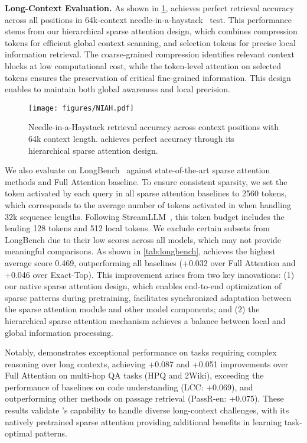 \textbf{Long-Context Evaluation.} As shown in \cref{fig:niah},
\method{} achieves perfect retrieval accuracy across all positions in 64k-context needle-in-a-haystack~\citep{kamradt2023llmtest} test. This performance stems from our hierarchical sparse attention design, which combines compression tokens for efficient global context scanning, and  
selection tokens for precise local information retrieval.  
The coarse-grained compression identifies relevant context blocks at low computational cost, while the token-level attention on selected tokens ensures the preservation of critical fine-grained information. This design enables \method{} to maintain both global awareness and local precision.

\begin{figure}[t]
    \centering
    \texttt{[image: figures/NIAH.pdf]}
    \caption{Needle-in-a-Haystack retrieval accuracy across context positions with 64k context length. \method{} achieves perfect accuracy through its hierarchical sparse attention design.}
    \label{fig:niah}
\end{figure}

We also evaluate \method{} on LongBench~\citep{bai2023longbench} against state-of-the-art sparse attention methods and Full Attention baseline. 
To ensure consistent sparsity, we set the token activated by each query in all sparse attention baselines to 2560 tokens, which corresponds to the average number of tokens activated in \method{} when handling 32k sequence lengths. Following StreamLLM~\citep{streaming}, this token budget includes the leading 128 tokens and 512 local tokens.
We exclude certain subsets from LongBench due to their low scores across all models, which may not provide meaningful comparisons. As shown in \cref{tab:longbench}, \method{} achieves the highest average score 0.469, outperforming all baselines (+0.032 over Full Attention and +0.046 over Exact-Top). This improvement arises from two key innovations: (1) our native sparse attention design, which enables end-to-end optimization of sparse patterns during pretraining, facilitates synchronized adaptation between the sparse attention module and other model components; and (2) the hierarchical sparse attention mechanism achieves a balance between local and global information processing.

Notably, \method{} demonstrates exceptional performance on tasks requiring complex reasoning over long contexts, achieving +0.087 and +0.051 improvements over Full Attention on multi-hop QA tasks (HPQ and 2Wiki), exceeding the performance of baselines on code understanding (LCC: +0.069), and outperforming other methods on passage retrieval (PassR-en: +0.075). These results validate \method{}'s capability to handle diverse long-context challenges, with its natively pretrained sparse attention providing additional benefits in learning task-optimal patterns.


